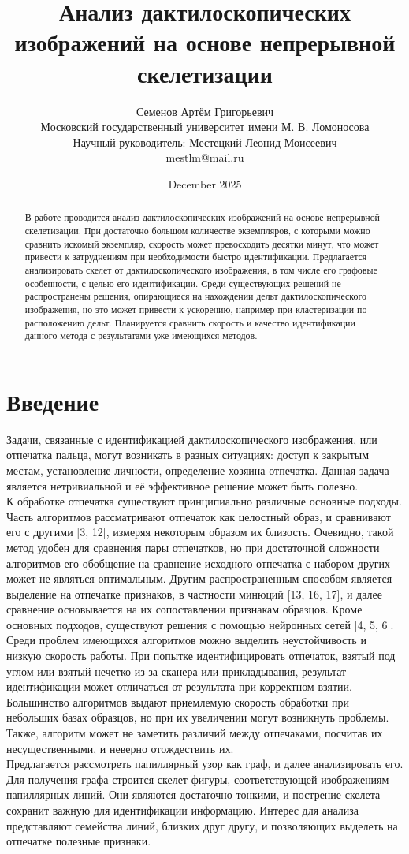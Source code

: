\documentclass{article}
\title{Анализ дактилоскопических изображений на основе непрерывной скелетизации}
\author{ Семенов Артём Григорьевич\\
	Московский государственный университет имени М. В. Ломоносова \\
        Научный руководитель: Местецкий Леонид Моисеевич \\ 
        mestlm@mail.ru}
\date{December 2025}
\begin{document}
\maketitle
\begin{abstract}
    В работе проводится анализ дактилоскопических изображений на основе непрерывной скелетизации. При достаточно большом количестве экземпляров, с которыми можно сравнить искомый экземпляр, скорость может превосходить десятки минут, что может привести к затруднениям при необходимости быстро идентификации. Предлагается анализировать скелет от дактилоскопического изображения, в том числе его графовые особенности, с целью его идентификации. Среди существующих решений не распространены решения, опирающиеся на нахождении дельт дактилоскопического изображения, но это может привести к ускорению, например при кластеризации по расположению дельт. Планируется сравнить скорость и качество идентификации данного метода с результатами уже имеющихся методов.
\end{abstract}
\section{Введение}
Задачи, связанные с идентификацией дактилоскопического изображения, или отпечатка пальца, могут возникать в разных ситуациях: доступ к закрытым местам, установление личности, определение хозяина отпечатка. Данная задача является нетривиальной и её эффективное решение может быть полезно. \\
К обработке отпечатка существуют принципиально различные основные подходы. Часть алгоритмов рассматривают отпечаток как целостный образ, и сравнивают его с другими [3, 12], измеряя некоторым образом их близость. Очевидно, такой метод удобен для сравнения пары отпечатков, но при достаточной сложности алгоритмов его обобщение на сравнение исходного отпечатка с набором других может не являться оптимальным. Другим распространенным способом является выделение на отпечатке признаков, в частности минюций [13, 16, 17], и далее сравнение основывается на их сопоставлении признакам образцов. Кроме основных подходов, существуют решения с помощью нейронных сетей [4, 5, 6]. \\
Среди проблем имеющихся алгоритмов можно выделить неустойчивость и низкую скорость работы. При попытке идентифицировать отпечаток, взятый под углом или взятый нечетко из-за сканера или прикладывания, результат идентификации может отличаться от результата при корректном взятии. Большинство алгоритмов выдают приемлемую скорость обработки при небольших базах образцов, но при их увеличении могут возникнуть проблемы. Также, алгоритм может не заметить различий между отпечаками, посчитав их несущественными, и неверно отождествить их. \\
Предлагается рассмотреть папиллярный узор как граф, и далее анализировать его. Для получения графа строится скелет фигуры, соответствующей изображениям папиллярных линий. Они являются достаточно тонкими, и пострение скелета сохранит важную для идентификации информацию. Интерес для анализа представляют семейства линий, близких друг другу, и позволяющих выделеть на отпечатке полезные признаки.
\end{document}
